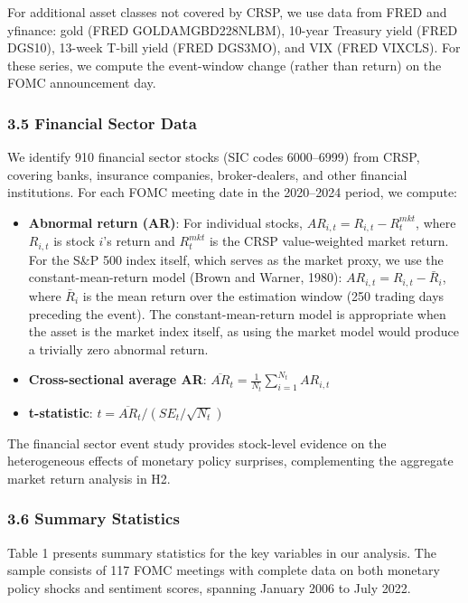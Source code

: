 \documentclass[12pt]{article}
\begin{document}
For additional asset classes not covered by CRSP, we use data from FRED
and yfinance: gold (FRED GOLDAMGBD228NLBM), 10-year Treasury yield (FRED
DGS10), 13-week T-bill yield (FRED DGS3MO), and VIX (FRED VIXCLS). For
these series, we compute the event-window change (rather than return) on
the FOMC announcement day.

\subsubsection{3.5 Financial Sector Data}\label{financial-sector-data}

We identify 910 financial sector stocks (SIC codes 6000--6999) from
CRSP, covering banks, insurance companies, broker-dealers, and other
financial institutions. For each FOMC meeting date in the 2020--2024
period, we compute:

\begin{itemize}
\item
  \textbf{Abnormal return (AR)}: For individual stocks,
  \(AR_{i,t} = R_{i,t} - R^{mkt}_t\), where \(R_{i,t}\) is stock \(i\)'s
  return and \(R^{mkt}_t\) is the CRSP value-weighted market return. For
  the S\&P 500 index itself, which serves as the market proxy, we use
  the constant-mean-return model (Brown and Warner, 1980):
  \(AR_{i,t} = R_{i,t} - \bar{R}_i\), where \(\bar{R}_i\) is the mean
  return over the estimation window (250 trading days preceding the
  event). The constant-mean-return model is appropriate when the asset
  is the market index itself, as using the market model would produce a
  trivially zero abnormal return.
\item
  \textbf{Cross-sectional average AR}:
  \(\overline{AR}_t = \frac{1}{N_t} \sum_{i=1}^{N_t} AR_{i,t}\)
\item
  \textbf{t-statistic}: \(t = \overline{AR}_t / (SE_t / \sqrt{N_t})\)
\end{itemize}

The financial sector event study provides stock-level evidence on the
heterogeneous effects of monetary policy surprises, complementing the
aggregate market return analysis in H2.

\subsubsection{3.6 Summary Statistics}\label{summary-statistics}

Table 1 presents summary statistics for the key variables in our
analysis. The sample consists of 117 FOMC meetings with complete data on
both monetary policy shocks and sentiment scores, spanning January 2006
to July 2022.
\end{document}
